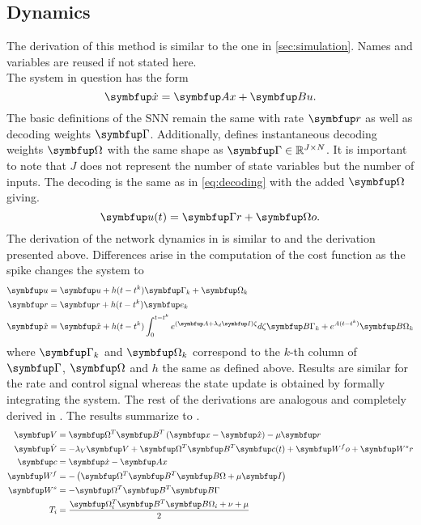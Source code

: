 \subsection{Dynamics}\label{ssec:control_dynamics}
The derivation of this method is similar to the one in \cref{sec:simulation}. Names and variables are reused if not stated here.\\
The system in question has the form
\begin{equation}\label{eq:contsys}
	\bmu{\dot{x}} = \bmu{Ax} + \bmu{Bu}.
\end{equation}
The basic definitions of the \ac{SNN} remain the same with rate $\bmu{r}$ as well as decoding weights $\bmu{\Gamma}$. Additionally, \cite{huang_optimizing_2017} defines instantaneous decoding weights $\bmu{\Omega}$ with the same shape as $\bmu{\Gamma}\in \mathbb{R}^{J\times N}$. It is important to note that $J$ does not represent the number of state variables but the number of inputs. The decoding is the same as in \cref{eq:decoding} with the added $\bmu{\Omega}$ giving.
\begin{equation}
	\bmu{u}(t) = \bmu{\Gamma r} + \bmu{\Omega o}.
\end{equation}
The derivation of the network dynamics in \cite{huang_dynamics_2019} is similar to \cite{boerlin_predictive_2013} and the derivation presented above. Differences arise in the computation of the cost function as the spike changes the system to
\begin{equation}\label{eq:control_spike_change}
	\begin{aligned}
	\bmu{u} &= \bmu{u} + h(t-t^k)\bmu{\Gamma}_k + \bmu{\Omega}_k\\
	\bmu{r} &= \bmu{r} + h(t-t^k)\bmu{e}_k\\
	\bmu{\hat{x}} &= \bmu{\hat{x}} + h(t-t^k)\int_{0}^{t-t^k}e^{(\bmu{A}+\lambda_d\bmu{I})\zeta}d\zeta \bmu{B\Gamma}_k + e^{A(t-t^k)}\bmu{B\Omega}_k
	\end{aligned}
\end{equation}
where $\bmu{\Gamma}_k$ and $\bmu{\Omega}_k$ correspond to the $k$-th column of $\bmu{\Gamma}$, $\bmu{\Omega}$ and $h$ the same as defined above. Results are similar for the rate and control signal whereas the state update is obtained by formally integrating the system. The rest of the derivations are analogous and completely derived in \cite{huang_optimizing_2017}. The results summarize to .
\begin{align}
	\bmu{V} &= \bmu{\Omega}^T\bmu{B}^T\left(\bmu{x} -\bmu{\hat{x}}\right) - \mu \bmu{r}\label{eq:control_dyn_begin}\\
	\bmu{\dot{V}} &= -\lambda_V\bmu{V} + \bmu{\Omega}^T \bmu{B}^T \bmu{c}(t) + \bmu{W^fo} + \bmu{W^sr}\label{eq:control_dyn_2}\\
	\bmu{c} &= \bmu{\dot{x}} - \bmu{Ax}\\\label{eq:feeback_c}
	\bmu{W^f} &= - \left(\bmu{\Omega}^T\bmu{B}^T\bmu{B\Omega} + \mu\bmu{I}\right)\\
	\bmu{W^s} &= -\bmu{\Omega}^T\bmu{B}^T\bmu{B\Gamma}\label{eq:Ws_wrong}\\
	T_i &= \frac{\bmu{\Omega}_i^T\bmu{B}^T\bmu{B\Omega}_i + \nu  + \mu}{2}
	\label{eq:control_dyn_end}
\end{align}
